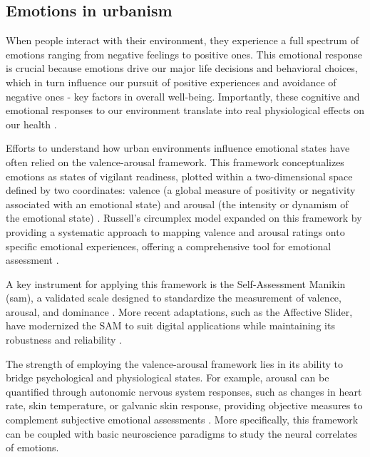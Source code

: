 
\subsection{Emotions in urbanism}

When people interact with their environment, they experience a full spectrum of emotions ranging from negative feelings to positive ones. This emotional response is crucial because emotions drive our major life decisions and behavioral choices, which in turn influence our pursuit of positive experiences and avoidance of negative ones - key factors in overall well-being. Importantly, these cognitive and emotional responses to our environment translate into real physiological effects on our health \cite{fredricksonCultivatingPositiveEmotions2000}.

Efforts to understand how urban environments influence emotional states have often relied on the valence-arousal framework. This framework conceptualizes emotions as states of vigilant readiness, plotted within a two-dimensional space defined by two coordinates: valence (a global measure of positivity or negativity associated with an emotional state) and arousal (the intensity or dynamism of the emotional state) \cite{langEmotionProbeStudies1995, nidalEEGERPAnalysis2014}. Russell’s circumplex model expanded on this framework by providing a systematic approach to mapping valence and arousal ratings onto specific emotional experiences, offering a comprehensive tool for emotional assessment \cite{russellCircumplexModelAffect1980}.

A key instrument for applying this framework is the Self-Assessment Manikin (\acrshort{sam}), a validated scale designed to standardize the measurement of valence, arousal, and dominance \cite{bradleyMeasuringEmotionSelfassessment1994}. More recent adaptations, such as the Affective Slider, have modernized the SAM to suit digital applications while maintaining its robustness and reliability \cite{betellaAffectiveSliderDigital2016}.

The strength of employing the valence-arousal framework lies in its ability to bridge psychological and physiological states. For example, arousal can be quantified through autonomic nervous system responses, such as changes in heart rate, skin temperature, or galvanic skin response, providing objective measures to complement subjective emotional assessments \cite{nidalEEGERPAnalysis2014}. More specifically, this framework can be coupled with basic neuroscience paradigms to study the neural correlates of emotions.

